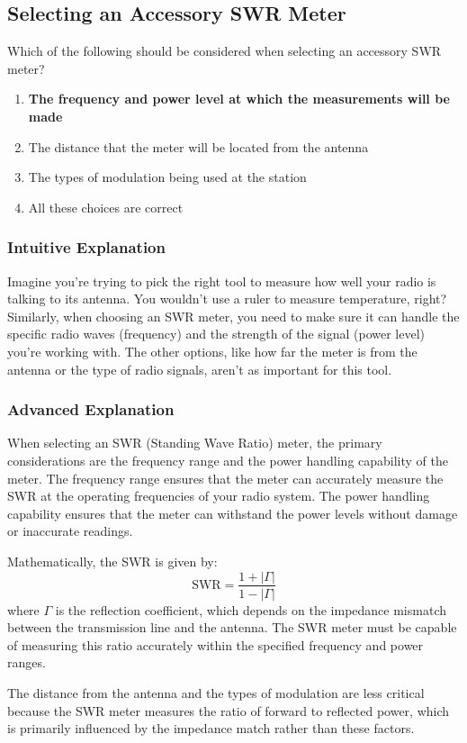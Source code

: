 \subsection{Selecting an Accessory SWR Meter}
\label{T4A02}

\begin{tcolorbox}[colback=gray!10!white,colframe=black!75!black,title=T4A02]
Which of the following should be considered when selecting an accessory SWR meter?
\begin{enumerate}[label=\Alph*)]
    \item \textbf{The frequency and power level at which the measurements will be made}
    \item The distance that the meter will be located from the antenna
    \item The types of modulation being used at the station
    \item All these choices are correct
\end{enumerate}
\end{tcolorbox}

\subsubsection{Intuitive Explanation}
Imagine you're trying to pick the right tool to measure how well your radio is talking to its antenna. You wouldn't use a ruler to measure temperature, right? Similarly, when choosing an SWR meter, you need to make sure it can handle the specific radio waves (frequency) and the strength of the signal (power level) you're working with. The other options, like how far the meter is from the antenna or the type of radio signals, aren't as important for this tool.

\subsubsection{Advanced Explanation}
When selecting an SWR (Standing Wave Ratio) meter, the primary considerations are the frequency range and the power handling capability of the meter. The frequency range ensures that the meter can accurately measure the SWR at the operating frequencies of your radio system. The power handling capability ensures that the meter can withstand the power levels without damage or inaccurate readings.

Mathematically, the SWR is given by:
\[
\text{SWR} = \frac{1 + |\Gamma|}{1 - |\Gamma|}
\]
where \(\Gamma\) is the reflection coefficient, which depends on the impedance mismatch between the transmission line and the antenna. The SWR meter must be capable of measuring this ratio accurately within the specified frequency and power ranges.

The distance from the antenna and the types of modulation are less critical because the SWR meter measures the ratio of forward to reflected power, which is primarily influenced by the impedance match rather than these factors.

